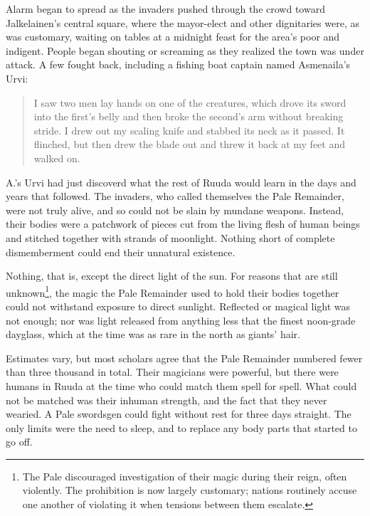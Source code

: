 \documentclass[12pt]{report}
\begin{document}
Alarm began to spread as the invaders pushed through the crowd toward
Jalkelainen's central square, where the mayor-elect and other
dignitaries were, as was customary, waiting on tables at a midnight
feast for the area's poor and indigent.  People began shouting or
screaming as they realized the town was under attack.  A few fought
back, including a fishing boat captain named Asmenaila's Urvi:

\begin{quotation}
I saw two men lay hands on one of the creatures, which drove its sword
into the first's belly and then broke the second's arm without
breaking stride.  I drew out my scaling knife and stabbed its neck as
it passed.  It flinched, but then drew the blade out and threw it back
at my feet and walked on.
\end{quotation}

A.'s Urvi had just discoverd what the rest of Ruuda would learn in the
days and years that followed.  The invaders, who called themselves the
Pale Remainder, were not truly alive, and so could not be slain by
mundane weapons.  Instead, their bodies were a patchwork of pieces cut
from the living flesh of human beings and stitched together with
strands of moonlight.  Nothing short of complete dismemberment could
end their unnatural existence.

Nothing, that is, except the direct light of the sun.  For reasons
that are still unknown\footnote{The Pale discouraged investigation of
their magic during their reign, often violently.  The prohibition is
now largely customary; nations routinely accuse one another of
violating it when tensions between them escalate.}, the magic the Pale
Remainder used to hold their bodies together could not withstand
exposure to direct sunlight.  Reflected or magical light was not
enough; nor was light released from anything less that the finest
noon-grade dayglass, which at the time was as rare in the north as
giants' hair.

Estimates vary, but most scholars agree that the Pale Remainder
numbered fewer than three thousand in total.  Their magicians were
powerful, but there were humans in Ruuda at the time who could match
them spell for spell.  What could not be matched was their inhuman
strength, and the fact that they never wearied.  A Pale swordsgen
could fight without rest for three days straight.  The only limits
were the need to sleep, and to replace any body parts that started to
go off.
\end{document}
